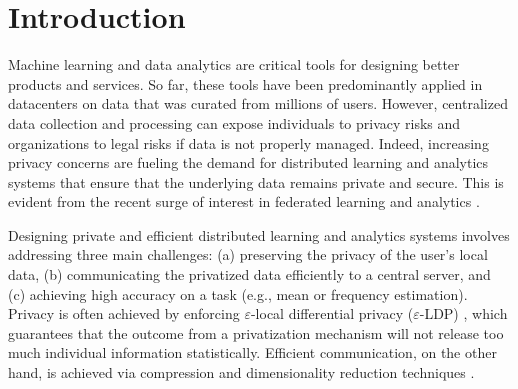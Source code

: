 \section{Introduction}
\label{sec:introduction}
Machine learning and data analytics are critical tools for designing better products and services. So far, these tools have been predominantly applied in datacenters on data that was curated from millions of users. However, centralized data collection and processing can expose individuals to privacy risks and organizations to legal risks if data is not properly managed. Indeed, increasing privacy concerns are fueling the demand for distributed learning and analytics systems that ensure that the underlying data remains private and secure. This is evident from the recent surge of interest in federated learning and analytics \citep[e.g.,][]{RM20,KM21}.

Designing private and efficient distributed learning and analytics systems involves addressing three main challenges: (a) preserving the privacy of the user's local data, (b) communicating the privatized data efficiently to a central server, and (c) achieving high accuracy on a task (e.g., mean or frequency estimation). Privacy is often achieved by enforcing $\varepsilon$-local differential privacy
($\varepsilon$-LDP) \citep{warner1965randomized, evfimievski2003limiting, dwork2006calibrating, kasiviswanathan2011can}, which guarantees that the outcome from a privatization mechanism will not release too much individual information statistically. Efficient communication, on the other hand, is achieved via compression and dimensionality reduction techniques  \citep{an2016distributed, alistarh17qsgd, wen2017terngrad, wang2018atomo, han2018distributed, han2018geometric, agarwal2018cpsgd, g2019vqsgd, barnes2020rtopk, CKO21}. 

